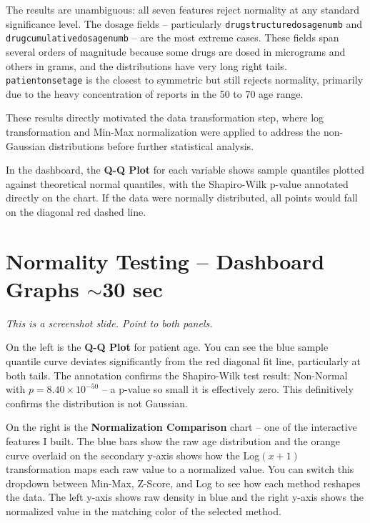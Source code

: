 \documentclass[12pt, letterpaper]{article}
\begin{document}
The results are unambiguous: all seven features reject normality at any standard
significance level. The dosage fields -- particularly
\texttt{drugstructuredosagenumb} and \texttt{drugcumulativedosagenumb} -- are
the most extreme cases. These fields span several orders of magnitude because
some drugs are dosed in micrograms and others in grams, and the distributions
have very long right tails. \texttt{patientonsetage} is the closest to symmetric
but still rejects normality, primarily due to the heavy concentration of
reports in the 50 to 70 age range.

These results directly motivated the data transformation step, where log
transformation and Min-Max normalization were applied to address the
non-Gaussian distributions before further statistical analysis.

In the dashboard, the \textbf{Q-Q Plot} for each variable shows sample quantiles
plotted against theoretical normal quantiles, with the Shapiro-Wilk p-value
annotated directly on the chart. If the data were normally distributed, all
points would fall on the diagonal red dashed line.

\section{Normality Testing -- Dashboard Graphs \hfill \textcolor{slidenumber}{\small $\sim$30 sec}}

\begin{notebox}
\textit{This is a screenshot slide. Point to both panels.}
\end{notebox}

On the left is the \textbf{Q-Q Plot} for patient age. You can see the blue
sample quantile curve deviates significantly from the red diagonal fit line,
particularly at both tails. The annotation confirms the Shapiro-Wilk test
result: Non-Normal with $p = 8.40 \times 10^{-50}$ -- a p-value so small it
is effectively zero. This definitively confirms the distribution is not Gaussian.

On the right is the \textbf{Normalization Comparison} chart -- one of the
interactive features I built. The blue bars show the raw age distribution and
the orange curve overlaid on the secondary y-axis shows how the Log$(x+1)$
transformation maps each raw value to a normalized value. You can switch this
dropdown between Min-Max, Z-Score, and Log to see how each method reshapes the
data. The left y-axis shows raw density in blue and the right y-axis shows the
normalized value in the matching color of the selected method.
\end{document}
